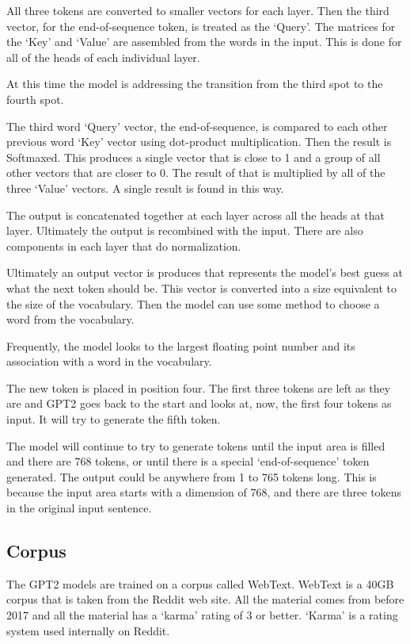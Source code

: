 All three tokens are converted to smaller vectors for each layer. Then the third vector, for the end-of-sequence token, is treated as the `Query'. The matrices for the `Key' and `Value' are assembled from the words in the input. This is done for all of the heads of each individual layer.

At this time the model is addressing the transition from the third spot to the fourth spot.

The third word `Query' vector, the end-of-sequence, is compared to each other previous word `Key' vector using dot-product multiplication. Then the result is Softmaxed. This produces a single vector that is close to 1 and a group of all other vectors that are closer to 0. The result of that is multiplied by all of the three `Value' vectors. A single result is found in this way.

The output is concatenated together at each layer across all the heads at that layer. Ultimately the output is recombined with the input. There are also components in each layer that do normalization.

Ultimately an output vector is produces that represents the model's best guess at what the next token should be. This vector is converted into a size equivalent to the size of the vocabulary. Then the model can use some method to choose a word from the vocabulary. 

Frequently, the model looks to the largest floating point number and its association with a word in the vocabulary.

The new token is placed in position four. The first three tokens are left as they are and GPT2 goes back to the start and looks at, now, the first four tokens as input. It will try to generate the fifth token.

The model will continue to try to generate tokens until the input area is filled and there are 768 tokens, or until there is a special `end-of-sequence' token generated. The output could be anywhere from 1 to 765 tokens long. This is because the input area starts with a dimension of 768, and there are three tokens in the original input sentence.

\subsection{Corpus}
The GPT2 models are trained on a corpus called WebText. WebText is a 40GB corpus that is taken from the Reddit web site. All the material comes from before 2017 and all the material has a `karma' rating of 3 or better. `Karma' is a rating system used internally on Reddit. 


